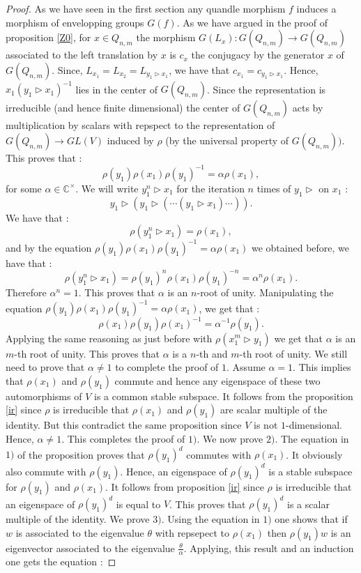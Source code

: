\documentclass[12pt, reqno]{amsart}
\begin{document}
\begin{proof}
As we have seen in the first section any quandle morphism $f$ induces a morphism of envelopping groups $G(f)$. As we have argued in the proof of proposition \ref{Z0}, for $x\in Q_{n,m}$ the morphism $G(L_x) : G(Q_{n,m})\to G(Q_{n,m})$ associated to the left translation by $x$ is $c_x$ the conjugacy by the generator $x$ of $G(Q_{n,m})$. Since, $L_{x_1}=L_{x_2}=L_{y_1\triangleright x_1}$, we have that $c_{x_1}=c_{y_1\triangleright x_1}$. Hence, $x_1( y_1\triangleright x_1)^{-1}$ lies in the center of $G(Q_{n,m})$. Since the representation is irreducible (and hence finite dimensional) the center of $G(Q_{n,m})$ acts by multiplication by scalars with repspect to the representation of ${G(Q_{n,m})}\to GL(V)$ induced by $\rho$ (by the universal property of $G(Q_{n,m}))$. This proves that : $$\rho(y_1)\rho(x_1)\rho(y_1)^{-1}=\alpha \rho(x_1),$$
for some $\alpha \in \mathbb{C}^\times$. We will write $y_1^n\triangleright x_1$ for the iteration $n$ times of $y_1\triangleright$ on $x_1$ : $$y_1\triangleright (y_1\triangleright( \cdots (y_1\triangleright x_1)\cdots)).$$
We have that : 
$$ \rho(y_1^n\triangleright x_1)=\rho(x_1),$$
and by the equation $\rho(y_1)\rho(x_1)\rho(y_1)^{-1}=\alpha \rho(x_1)$ we obtained before, we have that :
$$\rho(y_1^n\triangleright x_1)=\rho(y_1)^n\rho(x_1)\rho(y_1)^{-n}=\alpha^n\rho(x_1).$$
Therefore $\alpha^n=1$. This proves that $\alpha$ is an $n$-root of unity. Manipulating the equation $\rho(y_1)\rho(x_1)\rho(y_1)^{-1}=\alpha \rho(x_1)$, we get that :
$$\rho(x_1)\rho(y_1)\rho(x_1)^{-1}=\alpha^{-1} \rho(y_1).$$
Applying the same reasoning as just before with $\rho(x_1^m\triangleright y_1)$ we get that $\alpha$ is an $m$-th root of unity. This proves that $\alpha$ is a $n$-th and $m$-th root of unity. We still need to prove that $\alpha \neq 1$ to complete the proof of $1$. Assume $\alpha=1$. This implies that $\rho(x_1)$ and $\rho(y_1)$ commute and hence any eigenspace of these two automorphisms of $V$ is a common stable subspace. It follows from the proposition \ref{ir} since $\rho $ is irreducible that $\rho(x_1)$ and $\rho(y_1)$ are scalar multiple of the identity. But this contradict the same proposition since $V$ is not $1$-dimensional. Hence, $\alpha \neq 1$. This completes the proof of $1)$. We now prove $2)$. The equation in $1)$ of the proposition proves that $\rho(y_1)^d$ commutes with $\rho(x_1)$. It obviously also commute with $\rho(y_1)$. Hence, an eigenspace of $\rho(y_1)^d$ is a stable subspace for $\rho(y_1)$ and $\rho(x_1)$. It follows from proposition \ref{ir} since $\rho$ is irreducible that an eigenspace of $\rho(y_1)^d$ is equal to $V$. This proves that $\rho(y_1)^d$ is a scalar multiple of the identity. We prove $3)$. Using the equation in $1)$ one shows that if $w$ is associated to the eigenvalue $\theta$ with repsepect to $\rho(x_1)$ then $\rho(y_1)w$ is an eigenvector associated to the eigenvalue $\frac{\theta}{\alpha}$. Applying, this result and an induction one gets the equation : 

\end{proof}
\end{document}
